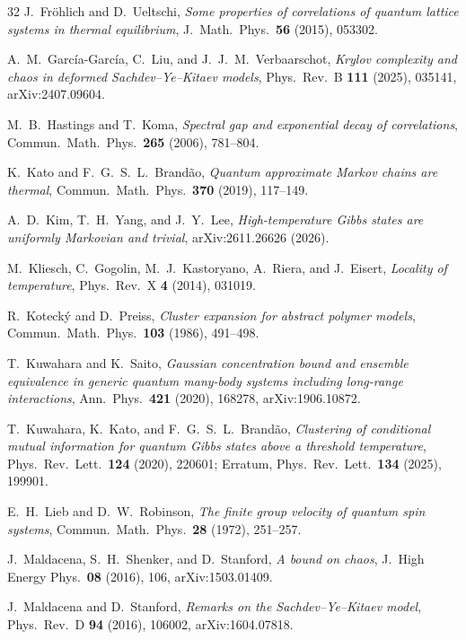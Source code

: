 \documentclass[11pt,a4paper]{article}
\numberwithin{equation}{section}
\theoremstyle{plain}
\theoremstyle{definition}
\begin{document}
\begin{thebibliography}{32}
J.~Fr\"ohlich and D.~Ueltschi,
\textit{Some properties of correlations of quantum lattice systems in thermal equilibrium},
J.\ Math.\ Phys.\ \textbf{56} (2015), 053302.

A.~M.~Garc\'ia-Garc\'ia, C.~Liu, and J.~J.~M.~Verbaarschot,
\textit{Krylov complexity and chaos in deformed Sachdev--Ye--Kitaev models},
Phys.\ Rev.\ B \textbf{111} (2025), 035141, arXiv:2407.09604.

M.~B.~Hastings and T.~Koma,
\textit{Spectral gap and exponential decay of correlations},
Commun.\ Math.\ Phys.\ \textbf{265} (2006), 781--804.

K.~Kato and F.~G.~S.~L.~Brand\~ao,
\textit{Quantum approximate Markov chains are thermal},
Commun.\ Math.\ Phys.\ \textbf{370} (2019), 117--149.

A.~D.~Kim, T.~H.~Yang, and J.~Y.~Lee,
\textit{High-temperature Gibbs states are uniformly Markovian and trivial},
arXiv:2611.26626 (2026).

M.~Kliesch, C.~Gogolin, M.~J.~Kastoryano, A.~Riera, and J.~Eisert,
\textit{Locality of temperature},
Phys.\ Rev.\ X \textbf{4} (2014), 031019.

R.~Koteck\'y and D.~Preiss,
\textit{Cluster expansion for abstract polymer models},
Commun.\ Math.\ Phys.\ \textbf{103} (1986), 491--498.

T.~Kuwahara and K.~Saito,
\textit{Gaussian concentration bound and ensemble equivalence in generic quantum many-body systems including long-range interactions},
Ann.\ Phys.\ \textbf{421} (2020), 168278, arXiv:1906.10872.

T.~Kuwahara, K.~Kato, and F.~G.~S.~L.~Brand\~ao,
\textit{Clustering of conditional mutual information for quantum Gibbs states above a threshold temperature},
Phys.\ Rev.\ Lett.\ \textbf{124} (2020), 220601; Erratum, Phys.\ Rev.\ Lett.\ \textbf{134} (2025), 199901.

E.~H.~Lieb and D.~W.~Robinson,
\textit{The finite group velocity of quantum spin systems},
Commun.\ Math.\ Phys.\ \textbf{28} (1972), 251--257.

J.~Maldacena, S.~H.~Shenker, and D.~Stanford,
\textit{A bound on chaos},
J.\ High Energy Phys.\ \textbf{08} (2016), 106, arXiv:1503.01409.

J.~Maldacena and D.~Stanford,
\textit{Remarks on the Sachdev--Ye--Kitaev model},
Phys.\ Rev.\ D \textbf{94} (2016), 106002, arXiv:1604.07818.


\end{thebibliography}
\end{document}
